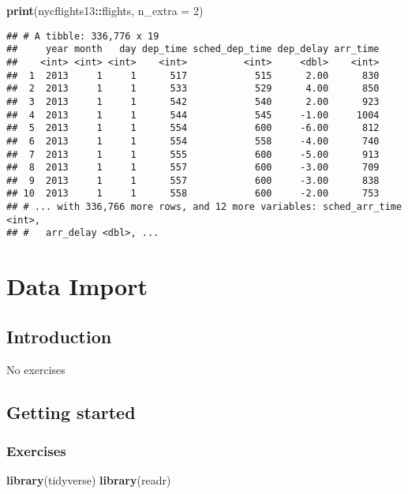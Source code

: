 \documentclass[]{article}
\newenvironment{Shaded}{\begin{snugshade}}{\end{snugshade}}
\newcommand{\KeywordTok}[1]{\textcolor[rgb]{0.13,0.29,0.53}{\textbf{#1}}}
\newcommand{\DataTypeTok}[1]{\textcolor[rgb]{0.13,0.29,0.53}{#1}}
\newcommand{\DecValTok}[1]{\textcolor[rgb]{0.00,0.00,0.81}{#1}}
\newcommand{\OperatorTok}[1]{\textcolor[rgb]{0.81,0.36,0.00}{\textbf{#1}}}
\newcommand{\NormalTok}[1]{#1}
\theoremstyle{definition}
\theoremstyle{definition}
\theoremstyle{definition}
\theoremstyle{remark}
\begin{document}
\begin{Shaded}
\begin{Highlighting}[]
\KeywordTok{print}\NormalTok{(nycflights13}\OperatorTok{::}\NormalTok{flights, }\DataTypeTok{n_extra =} \DecValTok{2}\NormalTok{)}
\end{Highlighting}
\end{Shaded}

\begin{verbatim}
## # A tibble: 336,776 x 19
##     year month   day dep_time sched_dep_time dep_delay arr_time
##    <int> <int> <int>    <int>          <int>     <dbl>    <int>
##  1  2013     1     1      517            515      2.00      830
##  2  2013     1     1      533            529      4.00      850
##  3  2013     1     1      542            540      2.00      923
##  4  2013     1     1      544            545     -1.00     1004
##  5  2013     1     1      554            600     -6.00      812
##  6  2013     1     1      554            558     -4.00      740
##  7  2013     1     1      555            600     -5.00      913
##  8  2013     1     1      557            600     -3.00      709
##  9  2013     1     1      557            600     -3.00      838
## 10  2013     1     1      558            600     -2.00      753
## # ... with 336,766 more rows, and 12 more variables: sched_arr_time <int>,
## #   arr_delay <dbl>, ...
\end{verbatim}

\section{Data Import}\label{data-import}

\subsection{Introduction}\label{introduction-7}

No exercises

\subsection{Getting started}\label{getting-started}

\subsubsection{Exercises}\label{exercises-19}

\begin{Shaded}
\begin{Highlighting}[]
\KeywordTok{library}\NormalTok{(tidyverse)}
\KeywordTok{library}\NormalTok{(readr)}
\end{Highlighting}
\end{Shaded}
\end{document}
